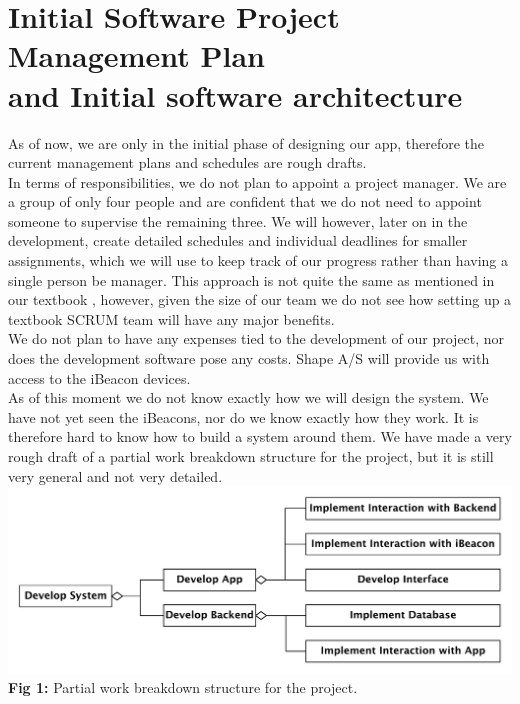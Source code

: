 \documentclass[12pt]{article}
\begin{document}
\newpage
\section{Initial Software Project Management Plan\\ and Initial software architecture}

As of now, we are only in the initial phase of designing our app, therefore the current management plans and schedules are rough drafts.\\

In terms of responsibilities, we do not plan to appoint a project manager. We are a group of only four people and are confident that we do not need to appoint someone to supervise the remaining three. We will however, later on in the development, create detailed schedules and individual deadlines for smaller assignments, which we will use to keep track of our progress rather than having a single person be manager. This approach is not quite the same as mentioned in our textbook \cite{OOSE}, however, given the size of our team we do not see how setting up a textbook SCRUM team will have any major benefits.\\

We do not plan to have any expenses tied to the development of our project, nor does the development software pose any costs. Shape A/S will provide us with access to the iBeacon devices.\\

As of this moment we do not know exactly how we will design the system. We have not yet seen the iBeacons, nor do we know exactly how they work. It is therefore hard to know how to build a system around them. We have made a very rough draft of a partial work breakdown structure for the project, but it is still very general and not very detailed.\\

\includegraphics[scale=0.6]{work_breakdown}\\
\textbf{Fig 1:} Partial work breakdown structure for the project.\\
\end{document}
